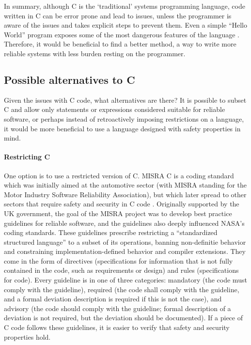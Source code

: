 In summary, although C is the `traditional' systems programming language, code written in C can be error prone and lead to issues, unless the programmer is aware of the issues and takes explicit steps to prevent them.
Even a simple ``Hello World'' program exposes some of the most dangerous features of the language \cite{milewski}.
Therefore, it would be beneficial to find a better method, a way to write more reliable systems with less burden resting on the programmer.

\subsection{Possible alternatives to C}
Given the issues with C code, what alternatives are there?
It is possible to subset C and allow only statements or expressions considered suitable for reliable software, or perhaps instead of retroactively imposing restrictions on a language, it would be more beneficial to use a language designed with safety properties in mind.

\paragraph{Restricting C}
One option is to use a restricted version of C.
MISRA C is a coding standard which was initially aimed at the automotive sector (with MISRA standing for the Motor Industry Software Reliability Association), but which later spread to other sectors that require safety and security in C code \cite{bagnara2018}.
Originally supported by the UK government, the goal of the MISRA project was to develop best practice guidelines for reliable software, and the guidelines also deeply influenced NASA's coding standards.
These guidelines prescribe restricting a ``standardized structured language'' to a subset of its operations, banning non-definitie behavior and constraining implementation-defined behavior and compiler extensions.
They come in the form of directives (specifications for information that is not fully contained in the code, such as requirements or design) and rules (specifications for code).
Every guideline is in one of three categories: mandatory (the code must comply with the guideline), required (the code shall comply with the guideline, and a formal deviation description is required if this is not the case), and advisory (the code should comply with the guideline; formal description of a deviation is not required, but the deviation should be documented).
If a piece of C code follows these guidelines, it is easier to verify that safety and security properties hold.

